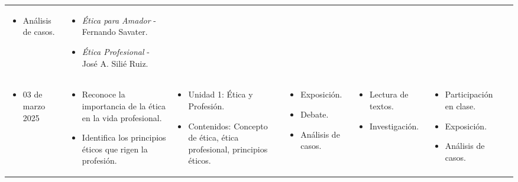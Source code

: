 \begin{landscape}
\begin{xltabular}{\linewidth}{@{}X@{}X@{}X@{}X@{}X@{}X@{}X@{}}
\begin{itemize}
            \item Análisis de casos.
        \end{itemize}                             &
        \begin{itemize}
            \item \textit{Ética para Amador} - Fernando Savater.
            \item \textit{Ética Profesional} - José A. Silié Ruiz.
        \end{itemize}\\
        \begin{itemize}[label={}, left=0pt .. 0pt]
            \item 03 de marzo 2025
        \end{itemize}                                                          &
        \begin{itemize}
            \item Reconoce la importancia de la ética en la vida profesional.
            \item Identifica los principios éticos que rigen la profesión.
        \end{itemize}          &
        \begin{itemize}
            \item Unidad 1: Ética y Profesión.
            \item Contenidos: Concepto de ética, ética profesional, principios éticos.
        \end{itemize} &
        \begin{itemize}
            \item Exposición.
            \item Debate.
            \item Análisis de casos.
        \end{itemize}                             &
        \begin{itemize}
            \item Lectura de textos.
            \item Investigación.
        \end{itemize}                             &
        \begin{itemize}
            \item Participación en clase.
            \item Exposición.
            \item Análisis de casos.

\end{itemize}
\end{xltabular}
\end{landscape}
